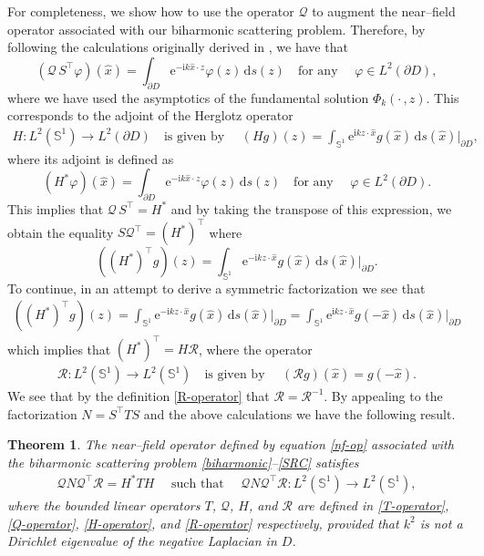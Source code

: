 \documentclass{article}
\newtheorem{theorem}{Theorem}[section]
\numberwithin{equation}{section}
\begin{document}
For completeness, we show how to use the operator $\mathcal{Q}$ to augment the near--field operator associated with our biharmonic scattering problem. Therefore, by following the calculations originally derived in \cite{nf-fft-dsm}, we have that 
$$(\mathcal{Q} \, S^{\top} \varphi) (\hat{x}) = \int_{\partial D} \text{e}^{-\text{i}k \hat{x}\cdot z} \varphi(z) \,  \text{d}s(z)  \quad  \textrm{for any } \quad \varphi \in L^2(\partial D),$$
where we have used the asymptotics of the fundamental solution $\Phi_k( \cdot \, ,  z )$. This corresponds to the adjoint of the Herglotz operator 
\begin{align}
H: L^2( \mathbb{S}^{1}) \longrightarrow L^2( \partial D)   \quad  \text{is given by } \quad  (H g)(z) = \int_{\mathbb{S}^{1}} \text{e}^{\text{i}k  z \cdot \hat{x}} g(\hat{x})  \,  \mathrm{d} s(\hat{x}) \Big|_{\partial D}, \label{H-operator}
\end{align}
where its adjoint is defined as 
$$(H^* \varphi) (\hat{x}) =  \int_{\partial D} \text{e}^{-\text{i}k \hat{x}\cdot z} \varphi(z)  \,   \text{d}s(z)  \quad  \textrm{for any } \quad \varphi \in L^2(\partial D).$$ 
This implies that $\mathcal{Q} \, S^{\top} = H^*$ and by taking the transpose of this expression, we obtain the equality $S\mathcal{Q}^\top = (H^*)^\top$ where 
$$\left( (H^*)^\top g \right) (z) = \int_{\mathbb{S}^{1}} \text{e}^{- \text{i}k  z \cdot \hat{x}} g(\hat{x})  \, \mathrm{d} s(\hat{x}) \Big|_{\partial D} .$$
To continue, in an attempt to derive a symmetric factorization we see that 
\begin{align*}
\left( (H^*)^\top g \right) (z) = \int_{\mathbb{S}^{1}} \text{e}^{- \text{i}k  z \cdot \hat{x}} g(\hat{x})  \,  \mathrm{d} s(\hat{x}) \Big|_{\partial D}= \int_{\mathbb{S}^{1}} \text{e}^{\text{i}k  z \cdot \hat{x}} g(-\hat{x})  \,  \mathrm{d} s(\hat{x}) \Big|_{\partial D}
\end{align*}
which implies that $(H^*)^\top =  H\mathcal{R}$, where the operator 
\begin{align}
\mathcal{R}:  L^2( \mathbb{S}^{1}) \longrightarrow L^2(\mathbb{S}^{1})\quad  \text{is given by } \quad (\mathcal{R}g)(\hat{x}) = g(-\hat{x}). \label{R-operator}
\end{align}
We see that by the definition \eqref{R-operator} that $\mathcal{R}=\mathcal{R}^{-1}$. By appealing to the factorization $N = S^\top T S$ and the above calculations we have the following result. 

\begin{theorem} 
The near--field operator defined by equation \eqref{nf-op} associated with the biharmonic scattering problem  \eqref{biharmonic}--\eqref{SRC} satisfies 
\begin{align} \label{FFT}
\mathcal{Q} N \mathcal{Q}^\top \mathcal{R} =H^*TH \quad \text{ such that } \quad \mathcal{Q} N \mathcal{Q}^\top \mathcal{R} :  L^2( \mathbb{S}^{1}) \longrightarrow L^2(\mathbb{S}^{1}),
\end{align}
where the bounded linear operators $T$, $\mathcal{Q}$, $H$, and $\mathcal{R}$ are defined in \eqref{T-operator}, \eqref{Q-operator},  \eqref{H-operator}, and \eqref{R-operator} respectively, provided that $k^2$ is not a Dirichlet eigenvalue of the negative Laplacian in $D$.
\end{theorem}
\end{document}
